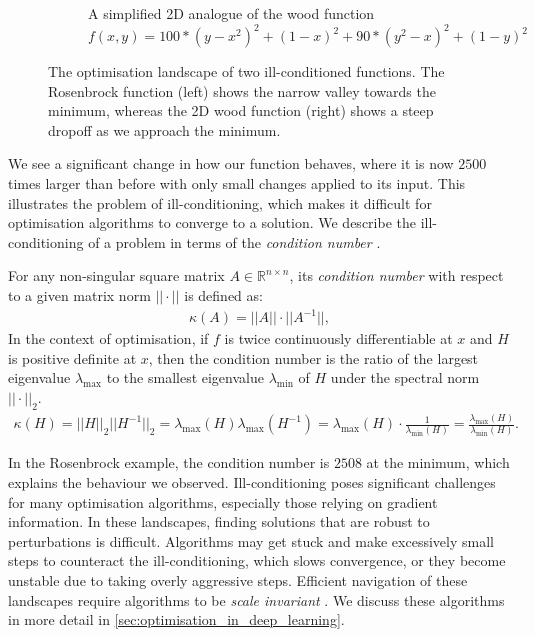 \begin{figure}[h]
\begin{subfigure}[b]{0.48\linewidth}
        \caption{A simplified 2D analogue of the wood function \\
        $f(x,y) = 100*(y - x^2)^2 + (1 - x)^2 + 90*(y^2 - x)^2 + (1 - y)^2$}
        \label{fig:wood_function}
    \end{subfigure}
    \caption{The optimisation landscape of two ill-conditioned functions. The Rosenbrock function (left) shows the narrow valley towards the minimum, whereas the 2D wood function (right) shows a steep dropoff as we approach the minimum.}
    \label{fig:ill_conditioned_functions}
\end{figure}

We see a significant change in how our function behaves, where it is now $2500$ times larger than before with only small changes applied to its input. This illustrates the problem of ill-conditioning, which makes it difficult for optimisation algorithms to converge to a solution. We describe the ill-conditioning of a problem in terms of the \textit{condition number} \citep{regression_book, cvbook}.

\begin{definition}
    For any non-singular square matrix $A \in \mathbb{R}^{n \times n}$, its \textit{condition number} with respect to a given matrix norm $||\cdot||$ is defined as:
    \begin{align}
        \kappa(A) = ||A||\cdot||A^{-1}||,
    \end{align}
    In the context of optimisation, if $f$ is twice continuously differentiable at $x$ and $H$ is positive definite at $x$, then the condition number is the ratio of the largest eigenvalue $\lambda_{\max}$ to the smallest eigenvalue $\lambda_{\min}$ of $H$ under the spectral norm $|| \cdot ||_2$. 
    \begin{align}
        \kappa(H) = ||H||_2||H^{-1}||_2 = \lambda_{\max}(H)\lambda_{\max}(H^{-1}) = \lambda_{\max}(H) \cdot \frac{1}{\lambda_{\min}(H)} = \frac{\lambda_{\max}(H)}{\lambda_{\min}(H)}.
    \end{align}
\end{definition}

In the Rosenbrock example, the condition number is $2508$ at the minimum, which explains the behaviour we observed. Ill-conditioning poses significant challenges for many optimisation algorithms, especially those relying on gradient information. In these landscapes, finding solutions that are robust to perturbations is difficult. Algorithms may get stuck and make excessively small steps to counteract the ill-conditioning, which slows convergence, or they become unstable due to taking overly aggressive steps. Efficient navigation of these landscapes require algorithms to be \textit{scale invariant} \citep{NoceWrig06}. We discuss these algorithms in more detail in \cref{sec:optimisation_in_deep_learning}.

